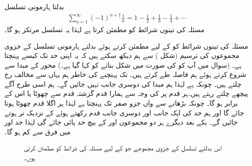 بدلتا ہارمونی تسلسل
\begin{align*}
\sum_{n=1}^{\infty}(-1)^{n+1}\frac{1}{n}=1-\frac{1}{2}+\frac{1}{3}-\frac{1}{4}+\cdots
\end{align*}
مسئلہ  کی تینوں شرائط کو مطمئن کرتا ہے لہٰذا یہ تسلسل مرتکز ہو گا۔

مسئلہ  کی تینوں شرائط کو  کے لیے مطمئن کرتے ہوئے بدلتے ہارمونی تسلسل کے جزوی مجموعوں کی ترسیم (شکل ) سے ہم دیکھ سکتے ہیں کہ یہ اپنی حد  تک کیسے پہنچتا ہے۔ (سوال  میں آپ کو  کی صورت میں شکل بنانے کو کہا گیا ہے۔) محور  کے مبدا سے شروع کرتے ہوئے ہم  فاصلہ طے کرتے ہیں۔  تک پہنچنے کی خاطر ہم یہاں سے مخالف رخ  چلتے ہیں۔ چونکہ  ہے لہٰذا ہم مبدا کی دوسری جانب نہیں جائیں گے۔ ہم اسی طرح آگے پیچھے چلتے رہتے ہیں۔ہر  قدم پر  کی وجہ سے ہمارا قدم گزشتہ قدم سے چھوٹا یا اس کے برابر ہو گا۔ چونکہ  بڑھانے سے  واں جزو صفر تک پہنچتا ہے لہٰذا ہر اگلا قدم  چھوٹا ہوتا جائے گا اور ہم حد  کی ایک جانب اور دوسری جانب قدم رکھتے ہوئے  کے نزدیک تر ہوتے جائیں گے۔ یکے بعد دیگرے ہر دو مجموعوں  اور  کے بیچ  حد  پائی  جائے گی لہٰذا حد اور  میں فرق  سے کم ہو گا۔
\begin{figure}
\centering
{}
\caption{
اس بدلتے  تسلسل کے جزوی مجموعے  جو  کے لیے مسئلہ  کی  شرائط کو مطمئن کرتی ہوں۔
}
\label{شکل_تسلسل_بدلتے_ہندسی_تسلسل_کے_جزوی_مجموعات}
\end{figure}

